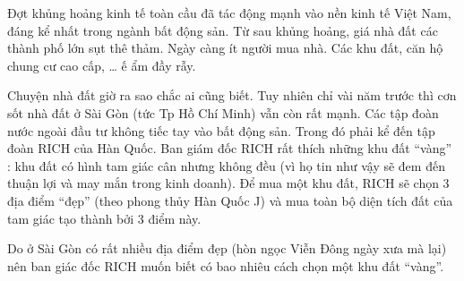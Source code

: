 Đợt khủng hoảng kinh tế toàn cầu đã tác động mạnh vào nền kinh tế Việt Nam, đáng kể nhất trong ngành bất động sản. Từ sau khủng hoảng, giá nhà đất các thành phố lớn sụt thê thảm. Ngày càng ít người mua nhà. Các khu đất, căn hộ chung cư cao cấp, … ế ẩm đầy rẫy.  

   Chuyện nhà đất giờ ra sao chắc ai cũng biết. Tuy nhiên chỉ vài năm trước thì cơn sốt nhà đất ở Sài Gòn (tức Tp Hồ Chí Minh) vẫn còn rất mạnh. Các tập đoàn nước ngoài đầu tư không tiếc tay vào bất động sản. Trong đó phải kể đến tập đoàn RICH của Hàn Quốc. Ban giám đốc RICH rất thích những khu đất “vàng” : khu đất có hình tam giác cân nhưng không đều (vì họ tin như vậy sẽ đem đến thuận lợi và may mắn trong kinh doanh). Để mua một khu đất, RICH sẽ chọn 3 địa điểm “đẹp” (theo phong thủy Hàn Quốc J) và mua toàn bộ diện tích đất của tam giác tạo thành bởi 3 điểm này.  

   Do ở Sài Gòn có rất nhiều địa điểm đẹp (hòn ngọc Viễn Đông ngày xưa mà lại) nên ban giác đốc RICH muốn biết có bao nhiêu cách chọn một khu đất “vàng”.  

\